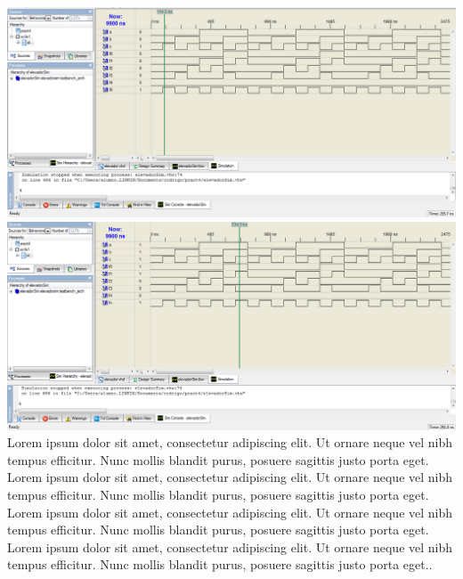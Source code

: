 \documentclass{mylib/reporteConCalif}
\begin{document}
\includegraphics[width=15cm]{img/labdise_pract4/r4_img3}\\

\includegraphics[width=15cm]{img/labdise_pract4/r4_img4}\\

Lorem ipsum dolor sit amet, consectetur adipiscing elit. Ut ornare neque vel nibh tempus efficitur. Nunc mollis blandit purus, posuere sagittis justo porta eget.\\


Lorem ipsum dolor sit amet, consectetur adipiscing elit. Ut ornare neque vel nibh tempus efficitur. Nunc mollis blandit purus, posuere sagittis justo porta eget. \\


Lorem ipsum dolor sit amet, consectetur adipiscing elit. Ut ornare neque vel nibh tempus efficitur. Nunc mollis blandit purus, posuere sagittis justo porta eget. \\

Lorem ipsum dolor sit amet, consectetur adipiscing elit. Ut ornare neque vel nibh tempus efficitur. Nunc mollis blandit purus, posuere sagittis justo porta eget..\\
\end{document}
